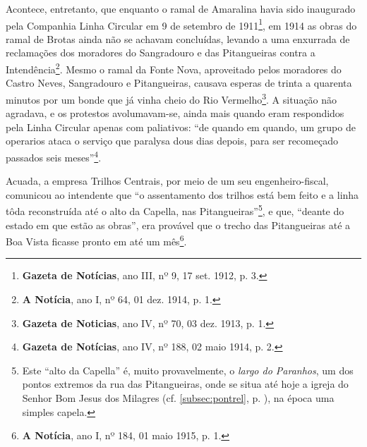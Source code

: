 Acontece, entretanto, que enquanto o ramal de Amaralina havia sido inaugurado pela Companhia Linha Circular em 9 de setembro de 1911\footnote{\textbf{Gazeta de Notícias}, ano III, nº 9, 17 set. 1912, p. 3.}, em 1914 as obras do ramal de Brotas ainda não se achavam concluídas, levando a uma enxurrada de reclamações dos moradores do Sangradouro e das Pitangueiras contra a Intendência\footnote{\textbf{A Notícia}, ano I, nº 64, 01 dez. 1914, p. 1.}. Mesmo o ramal da Fonte Nova, aproveitado pelos moradores do Castro Neves, Sangradouro e Pitangueiras, causava esperas de trinta a quarenta minutos por um bonde que já vinha cheio do Rio Vermelho\footnote{\textbf{Gazeta de Noticias}, ano IV, nº 70, 03 dez. 1913, p. 1.}. A situação não agradava, e os protestos avolumavam-se, ainda mais quando eram respondidos pela Linha Circular apenas com paliativos: ``de quando em quando, um grupo de operarios ataca o serviço que paralysa dous dias depois, para ser recomeçado passados seis meses''\footnote{\textbf{Gazeta de Notícias}, ano IV, nº 188, 02 maio 1914, p. 2.}. 

Acuada, a empresa Trilhos Centrais, por meio de um seu engenheiro-fiscal, comunicou ao intendente que ``o assentamento dos trilhos está bem feito e a linha tôda reconstruída até o alto da Capella, nas Pitangueiras''\footnote{Este ``alto da Capella'' é, muito provavelmente, o \textit{largo do Paranhos}, um dos pontos extremos da rua das Pitangueiras, onde se situa até hoje a igreja do Senhor Bom Jesus dos Milagres (cf. \autoref{subsec:pontrel}, p. \pageref{subsec:pontrel}), na época uma simples capela.}, e que, ``deante do estado em que estão as obras'', era provável que o trecho das Pitangueiras até a Boa Vista ficasse pronto em até um mês\footnote{\textbf{A Notícia}, ano I, nº 184, 01 maio 1915, p. 1.}. 

